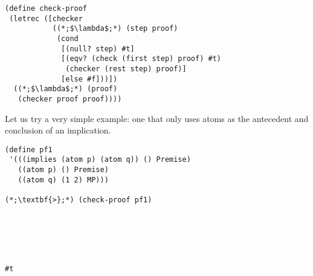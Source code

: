 \begin{cl}[]{}\begin{lstlisting}[language=MyScheme]
(define check-proof
 (letrec ([checker 
           ((*;$\lambda$;*) (step proof)
            (cond
             [(null? step) #t]
             [(eqv? (check (first step) proof) #t)
              (checker (rest step) proof)]
             [else #f]))])
  ((*;$\lambda$;*) (proof)
   (checker proof proof))))
\end{lstlisting}\end{cl}

Let us try a very simple example: one that only uses atoms as the antecedent and conclusion of an implication.

\begin{clo}[]{}
\begin{lstlisting}[language=MyScheme]
(define pf1 
 '(((implies (atom p) (atom q)) () Premise)
   ((atom p) () Premise)
   ((atom q) (1 2) MP)))

(*;\textbf{>};*) (check-proof pf1)
\end{lstlisting}
\tcblower
\begin{lstlisting}[language=MyOutput]





#t
\end{lstlisting}
\end{clo}



